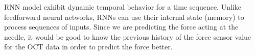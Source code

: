 
      RNN model exhibit dynamic temporal behavior for a time sequence. Unlike feedforward neural networks, RNNs can use their internal state (memory) to process sequences of inputs. Since we are predicting the force acting at the needle, it would be good to know the previous history of the force sensor value for the OCT data in order to predict the force better. 

